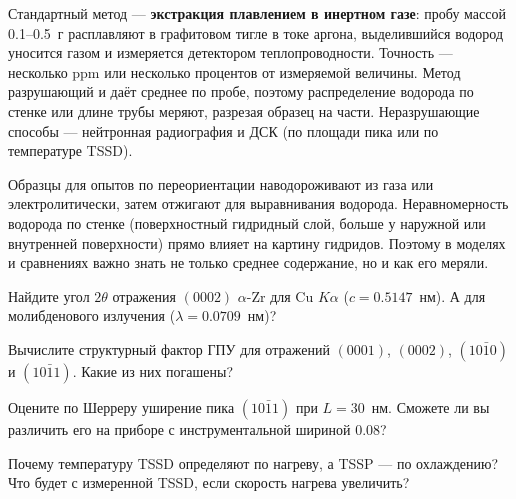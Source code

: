 Стандартный метод --- \textbf{экстракция плавлением в инертном газе}: пробу массой 0.1--0.5~г расплавляют в графитовом
тигле в токе аргона, выделившийся водород уносится газом и измеряется детектором теплопроводности. Точность ---
несколько ppm или несколько процентов от измеряемой величины. Метод разрушающий и даёт среднее по пробе, поэтому
распределение водорода по стенке или длине трубы меряют, разрезая образец на части. Неразрушающие способы ---
нейтронная радиография и ДСК (по площади пика или по температуре TSSD).

\begin{zrbox}
Образцы для опытов по переориентации наводороживают из газа или электролитически, затем отжигают для выравнивания
водорода. Неравномерность водорода по стенке (поверхностный гидридный слой, больше у наружной или внутренней
поверхности) прямо влияет на картину гидридов. Поэтому в моделях и сравнениях важно знать не только среднее
содержание, но и как его меряли.
\end{zrbox}

\begin{exercise}
Найдите угол $2\theta$ отражения $(0002)$ $\alpha$-Zr для Cu $K\alpha$ ($c = 0.5147$~нм). А для молибденового излучения
($\lambda = 0.0709$~нм)?
\end{exercise}

\begin{exercise}
Вычислите структурный фактор ГПУ для отражений $(0001)$, $(0002)$, $(10\bar10)$ и $(10\bar11)$. Какие из них погашены?
\end{exercise}

\begin{exercise}
Оцените по Шерреру уширение пика $(10\bar11)$ при $L = 30$~нм. Сможете ли вы различить его на приборе с
инструментальной шириной 0.08\textdegree?
\end{exercise}

\begin{exercise}
Почему температуру TSSD определяют по нагреву, а TSSP --- по охлаждению? Что будет с измеренной TSSD, если
скорость нагрева увеличить?
\end{exercise}
